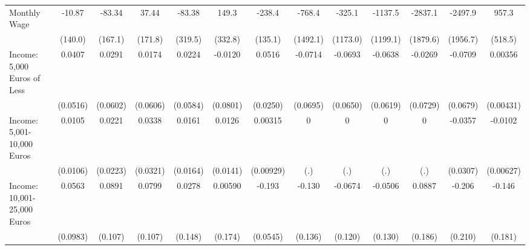 {\begin{tabular}{l*{12}{c}}
\addlinespace
Monthly Wage&      -10.87         &      -83.34         &       37.44         &      -83.38         &       149.3         &      -238.4         &      -768.4         &      -325.1         &     -1137.5         &     -2837.1         &     -2497.9         &       957.3         \\
            &     (140.0)         &     (167.1)         &     (171.8)         &     (319.5)         &     (332.8)         &     (135.1)         &    (1492.1)         &    (1173.0)         &    (1199.1)         &    (1879.6)         &    (1956.7)         &     (518.5)         \\
\addlinespace
Income: 5,000 Euros of Less&      0.0407         &      0.0291         &      0.0174         &      0.0224         &     -0.0120         &      0.0516\sym{*}  &     -0.0714         &     -0.0693         &     -0.0638         &     -0.0269         &     -0.0709         &     0.00356         \\
            &    (0.0516)         &    (0.0602)         &    (0.0606)         &    (0.0584)         &    (0.0801)         &    (0.0250)         &    (0.0695)         &    (0.0650)         &    (0.0619)         &    (0.0729)         &    (0.0679)         &   (0.00431)         \\
\addlinespace
Income: 5,001-10,000 Euros&      0.0105         &      0.0221         &      0.0338         &      0.0161         &      0.0126         &     0.00315         &           0         &           0         &           0         &           0         &     -0.0357         &     -0.0102         \\
            &    (0.0106)         &    (0.0223)         &    (0.0321)         &    (0.0164)         &    (0.0141)         &   (0.00929)         &         (.)         &         (.)         &         (.)         &         (.)         &    (0.0307)         &   (0.00627)         \\
\addlinespace
Income: 10,001-25,000 Euros&      0.0563         &      0.0891         &      0.0799         &      0.0278         &     0.00590         &      -0.193\sym{***}&      -0.130         &     -0.0674         &     -0.0506         &      0.0887         &      -0.206         &      -0.146         \\
            &    (0.0983)         &     (0.107)         &     (0.107)         &     (0.148)         &     (0.174)         &    (0.0545)         &     (0.136)         &     (0.120)         &     (0.130)         &     (0.186)         &     (0.210)         &     (0.181)         \\

\end{tabular}}
